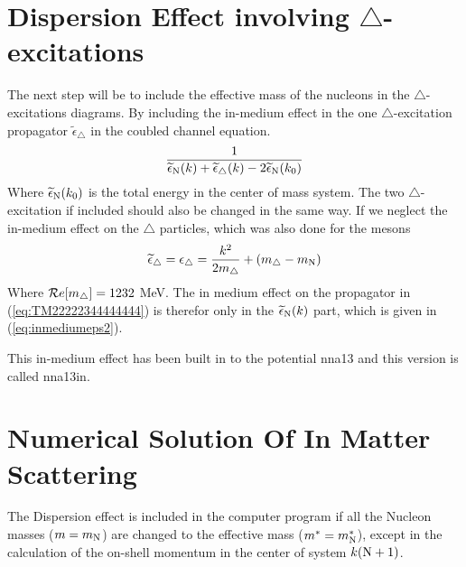 \section{Dispersion Effect involving $\triangle$-excitations} 
The next step will be to include the effective mass of the nucleons in the
$\triangle$-excitations diagrams. By including the in-medium effect in the one $\triangle$-excitation
propagator $\widetilde{\epsilon}_\triangle$ in the coubled channel equation. 
\begin{equation}\label{eq:TM22222344444444}
\frac{1}{\widetilde{\epsilon}_{{\text N}}({{ k}})+
\widetilde{\epsilon}_\triangle({{ k}})-2\widetilde{\epsilon}_{{\text N}}({{ k}}_0)}
\end{equation}
Where $\widetilde{\epsilon}_{{\text N}}({{ k}}_0)$ is the total energy in the center of mass system.
The two $\triangle$-excitation if included should also be changed in the same way.
If we neglect the in-medium effect on the $\triangle$ particles, which was also done for the mesons
\begin{equation}
\widetilde{\epsilon}_\triangle={\epsilon}_\triangle=\frac{{{ k}}^2}{2m_\triangle}+(m_\triangle-m_{{\text N}})  
\end{equation} 
Where ${\cal R}{e}[m_\triangle]=1232$ MeV. The in medium effect on the propagator in (\ref{eq:TM22222344444444})
is therefor only in the $\widetilde{\epsilon}_{{\text N}}({{ k}})$ part, which is given in
(\ref{eq:inmediumeps2}).

This in-medium effect has been built in to the potential nna13 and this version is called nna13in. 





\section{Numerical Solution Of In Matter Scattering}

The Dispersion effect is included in the computer program if all the Nucleon masses ($m=m_{{\text N}}$) 
are changed to the effective mass ($m^*=m^*_{{\text N}}$), except in the calculation of the on-shell momentum in
the center of system $k({{\text N}}+1)$.

